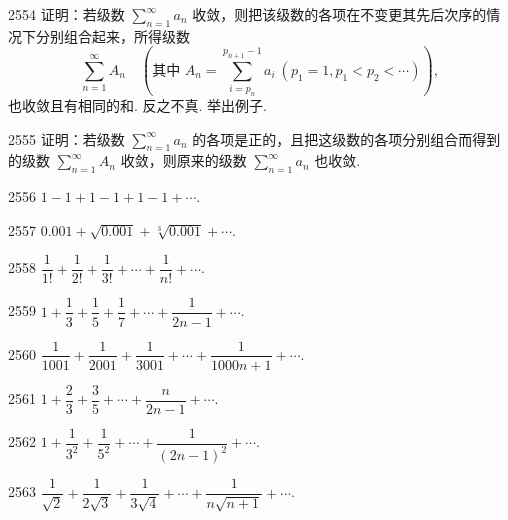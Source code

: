 \begin{prob}[M]{2554}
证明：若级数 $\sum_{n=1}^{\infty} a_n$ 收敛，则把该级数的各项在不变更其先后次序的情况下分别组合起来，所得级数
\[
\sum_{n=1}^{\infty} A_n \quad \left(\text{其中 } A_n = \sum_{i=p_n}^{p_{n+1}-1} a_i \ (p_1 = 1, p_1 < p_2 < \cdots)\right),
\]
也收敛且有相同的和. 反之不真. 举出例子.
\end{prob}

\begin{prob}[M]{2555}
证明：若级数 $\sum_{n=1}^{\infty} a_n$ 的各项是正的，且把这级数的各项分别组合而得到的级数 $\sum_{n=1}^{\infty} A_n$ 收敛，则原来的级数 $\sum_{n=1}^{\infty} a_n$ 也收敛.
\end{prob}


\begin{prob}[S]{2556}
$1 - 1 + 1 - 1 + 1 - 1 + \cdots$.
\end{prob}

\begin{prob}[S]{2557}
$0.001 + \sqrt{0.001} + \sqrt[3]{0.001} + \cdots$.
\end{prob}

\begin{prob}[S]{2558}
$\dfrac{1}{1!} + \dfrac{1}{2!} + \dfrac{1}{3!} + \cdots + \dfrac{1}{n!} + \cdots$.
\end{prob}

\begin{prob}[S]{2559}
$1 + \dfrac{1}{3} + \dfrac{1}{5} + \dfrac{1}{7} + \cdots + \dfrac{1}{2n - 1} + \cdots$.
\end{prob}

\begin{prob}[S]{2560}
$\dfrac{1}{1001} + \dfrac{1}{2001} + \dfrac{1}{3001} + \cdots + \dfrac{1}{1000n + 1} + \cdots$.
\end{prob}

\begin{prob}[S]{2561}
$1 + \dfrac{2}{3} + \dfrac{3}{5} + \cdots + \dfrac{n}{2n - 1} + \cdots$.
\end{prob}

\begin{prob}[S]{2562}
$1 + \dfrac{1}{3^2} + \dfrac{1}{5^2} + \cdots + \dfrac{1}{(2n - 1)^2} + \cdots$.
\end{prob}

\begin{prob}[S]{2563}
$\dfrac{1}{\sqrt{2}} + \dfrac{1}{2\sqrt{3}} + \dfrac{1}{3\sqrt{4}} + \cdots + \dfrac{1}{n\sqrt{n+1}} + \cdots$.
\end{prob}

